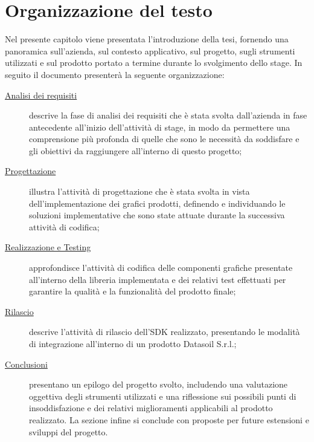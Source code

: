 \section{Organizzazione del testo}
Nel presente capitolo viene presentata l'introduzione della tesi, fornendo una panoramica sull'azienda, sul contesto applicativo,
sul progetto, sugli strumenti utilizzati e sul prodotto portato a termine durante lo svolgimento dello stage. \newline
In seguito il documento presenterà la seguente organizzazione:

\begin{description}
      \item[{\hyperref[chap:analisi-requisiti]{Analisi dei requisiti}}] descrive la fase di analisi dei requisiti che è stata
            svolta dall'azienda in fase antecedente all'inizio dell'attività di stage, in modo da permettere una comprensione più profonda
            di quelle che sono le necessità da soddisfare e gli obiettivi da raggiungere all'interno di questo progetto;

      \item[{\hyperref[chap:progettazione]{Progettazione}}] illustra l'attività di progettazione che è stata svolta in vista dell'implementazione
            dei grafici prodotti, definendo e individuando le soluzioni implementative che sono state attuate durante la successiva attività di codifica;

      \item[{\hyperref[chap:realizzazione-testing]{Realizzazione e Testing}}] approfondisce l'attività di codifica delle componenti grafiche presentate
            all'interno della libreria implementata e dei relativi test effettuati per garantire la qualità e la funzionalità del prodotto finale;

      \item[{\hyperref[chap:rilascio]{Rilascio}}] descrive l'attività di rilascio dell'SDK realizzato, presentando le modalità di integrazione
            all'interno di un prodotto Datasoil S.r.l.;

      \item[{\hyperref[chap:conclusioni]{Conclusioni}}] presentano un epilogo del progetto svolto, includendo una valutazione oggettiva
            degli strumenti utilizzati e una riflessione sui possibili punti di insoddisfazione e dei relativi miglioramenti applicabili al prodotto realizzato.
            La sezione infine si conclude con proposte per future estensioni e sviluppi del progetto.
\end{description}

